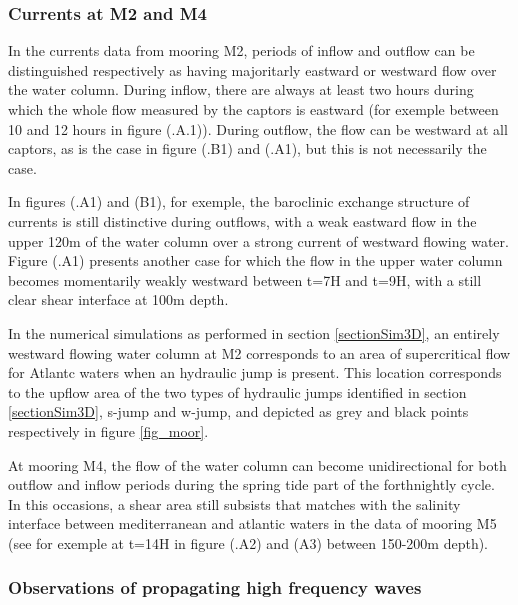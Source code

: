 \subsubsection{Currents at M2 and M4}

In the currents data from mooring M2, periods of inflow and outflow can be distinguished respectively as having majoritarly eastward or westward flow over the water column. During inflow, there are always at least two hours during which the whole flow measured by the captors is eastward (for exemple between 10 and 12 hours in figure (.A.1)). During outflow, the flow can be westward at all captors, as is the case in figure (.B1) and (.A1), but this is not necessarily the case. 

In figures (.A1) and (B1), for exemple, the baroclinic exchange structure of currents is still distinctive during outflows, with a weak eastward flow in the upper 120m of the water column over a strong current of westward flowing water. Figure (.A1) presents another case for which the flow in the upper water column becomes momentarily weakly westward between t=7H and t=9H, with a still clear shear interface at 100m depth.

In the numerical simulations as performed in section \ref{sectionSim3D}, an entirely westward flowing water column at M2 corresponds to an area of supercritical flow for Atlantc waters when an hydraulic jump is present. This location corresponds to the upflow area of the two types of hydraulic jumps identified in section \ref{sectionSim3D}, s-jump and w-jump, and depicted as grey and black points respectively in figure \ref{fig_moor}.


At mooring M4, the flow of the water column can become unidirectional for both outflow and inflow periods during the spring tide part of the forthnightly cycle. In this occasions, a shear area still subsists that matches with the salinity interface between mediterranean and atlantic waters in the data of mooring M5 (see for exemple at t=14H in figure (.A2) and (A3) between 150-200m depth).

\subsubsection{Observations of propagating high frequency waves}


